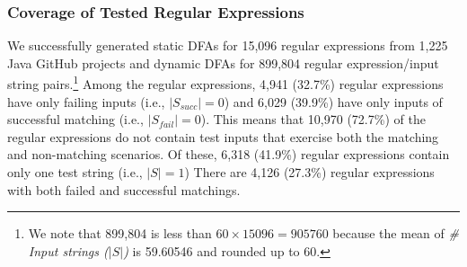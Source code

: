 
\subsubsection{Coverage of Tested Regular Expressions}
We successfully generated static DFAs for 15,096 regular expressions from 1,225 Java GitHub projects  and dynamic DFAs for 899,804 regular expression/input string pairs.\footnote{We note that 899,804 is less than $60 \times 15096 = 905760$ because the mean of {\em\# Input strings ($\lvert S \rvert$)} is 59.60546 and rounded up to 60.}%
Among the regular expressions, 4,941 (32.7\%)  regular expressions have only failing inputs (i.e., $\lvert S_{succ} \rvert = 0$) and 6,029 (39.9\%) have only inputs of successful matching (i.e.,  $\lvert S_{fail} \rvert = 0$). This means that 10,970 (72.7\%) of the regular expressions do not contain test inputs that exercise both the matching and non-matching scenarios. Of these, 6,318 (41.9\%) regular expressions contain only one test string (i.e., $\lvert S \rvert = 1$) There are  4,126 (27.3\%) regular expressions with both failed and successful matchings. %

